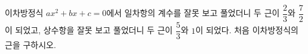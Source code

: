 이차방정식 $ax^2+bx+c=0$에서 일차항의 계수를 잘못 보고 풀었더니 두 근이 $\dfrac{2}{3}$와 $\dfrac{7}{2}$이 되었고, 상수항을 잘못 보고 풀었더니 두 근이 $\dfrac{5}{3}$와 $1$이 되었다. 처음 이차방정식의 근을 구하시오.

